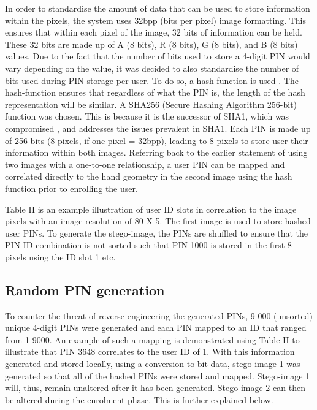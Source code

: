 
In order to standardise the amount of data that can be used to store information within the pixels, the system uses 32bpp (bits per pixel) image formatting. This ensures that within each pixel of the image, 32 bits of information can be held. These 32 bits are made up of A (8 bits), R (8 bits), G (8 bits), and B (8 bits) values. Due to the fact that the number of bits used to store a 4-digit PIN would vary depending on the value, it was decided to also standardise the number of bits used during PIN storage per user. To do so, a hash-function is used \citep{Kashyap2016}. 
The hash-function ensures that regardless of what the PIN is, the length of the hash representation will be similar. A SHA256 (Secure Hashing Algorithm 256-bit) function was chosen. This is because it is the successor of SHA1, which was compromised \citep{Brandom}, and addresses the issues prevalent in SHA1.
Each PIN is made up of 256-bits (8 pixels, if one pixel = 32bpp), leading to 8 pixels to store user their information within both images. Referring back to the earlier statement of using two images with a one-to-one relationship, a user PIN can be mapped and correlated directly to the hand geometry in the second image using the hash function prior to enrolling the user.

Table II is an example illustration of user ID slots in correlation to the image pixels with an image resolution of 80 X 5. The first image is used to store hashed user PINs. 
To generate the stego-image, the PINs are shuffled to ensure that the PIN-ID combination is not sorted such that PIN 1000 is stored in the first 8 pixels using the ID slot 1 etc.

\subsection{Random PIN generation}

To counter the threat of reverse-engineering the generated PINs, 9 000 (unsorted) unique 4-digit PINs were generated and each PIN mapped to an ID that ranged from 1-9000. An example of such a mapping is demonstrated using Table II to illustrate that PIN 3648 correlates to the user ID of 1. With this information generated and stored locally, using a conversion to bit data, stego-image 1 was generated so that all of the hashed PINs were stored and mapped. Stego-image 1 will, thus, remain unaltered after it has been generated. Stego-image 2 can then be altered during the enrolment phase. This is further explained below.

